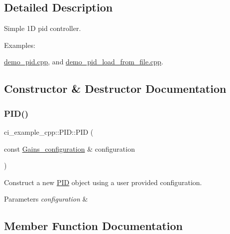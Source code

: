 \subsection{Detailed Description}
Simple 1D pid controller. \begin{Desc}
\item[Examples\+: ]\par
\hyperlink{demo_pid_8cpp-example}{demo\+\_\+pid.\+cpp}, and \hyperlink{demo_pid_load_from_file_8cpp-example}{demo\+\_\+pid\+\_\+load\+\_\+from\+\_\+file.\+cpp}.\end{Desc}


\subsection{Constructor \& Destructor Documentation}
\mbox{\label{classci__example__cpp_1_1PID_a5bbb703065bfd4c49b8d21e02d481c3d}} 
\subsubsection{\texorpdfstring{P\+I\+D()}{PID()}}
{\footnotesize\ttfamily ci\+\_\+example\+\_\+cpp\+::\+P\+I\+D\+::\+P\+ID (\begin{DoxyParamCaption}\item[{const \hyperlink{classci__example__cpp_1_1Gains__configuration}{Gains\+\_\+configuration} \&}]{configuration }\end{DoxyParamCaption})}



Construct a new \hyperlink{classci__example__cpp_1_1PID}{P\+ID} object using a user provided configuration. 


\begin{DoxyParams}{Parameters}
{\em configuration} & \\
\hline
\end{DoxyParams}


\subsection{Member Function Documentation}
\mbox{\label{classci__example__cpp_1_1PID_a75a4ccf0455e48e84af23e1d28b0337d}} 
